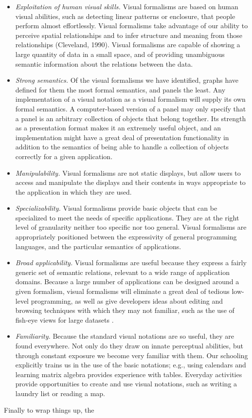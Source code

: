 \documentclass{sig-alternate}
\begin{document}
\begin{itemize}
  \item \emph{Exploitation of human visual skills.} Visual formalisms are based
  on human visual abilities, such as detecting linear patterns or enclosure,
  that people perform almost effortlessly. Visual formalisms take advantage of
  our ability to perceive spatial relationships and to infer structure and
  meaning from those relationships (Cleveland, 1990). Visual formalisms are
  capable of showing a large quantity of data in a small space, and of providing
  unambiguous semantic information about the relations between the data. \item
  \emph{Strong semantics.} Of the visual formalisms we have identified, graphs
  have defined for them the most formal semantics, and panels the least. Any
  implementation of a visual notation as a visual formalism will supply its own
  formal semantics. A computer-based version of a panel may only specify that a
  panel is an arbitrary collection of objects that belong together. Its strength
  as a presentation format makes it an extremely useful object, and an
  implementation might have a great deal of presentation functionality in
  addition to the semantics of being able to handle a collection of objects
  correctly for a given application. \item \emph{Manipulability.}  Visual
  formalisms are not static displays, but allow users to access and manipulate
  the displays and their contents in ways appropriate to the application in
  which they are used. \item \emph{Specializability.}  Visual formalisms provide
  basic objects that can be specialized to meet the needs of specific
  applications. They are at the right level of granularity neither too specific
  nor too general. Visual formalisms are appropriately positioned between the
  expressivity of general programming languages, and the particular semantics of
  applications. \item \emph{Broad applicability.}  Visual formalisms are useful
  because they express a fairly generic set of semantic relations, relevant to a
  wide range of application domains. Because a large number of applications can
  be designed around a given formalism, visual formalisms will eliminate a great
  deal of tedious low-level programming, as well as give developers ideas about
  editing and browsing techniques with which they may not familiar, such as the
  use of fish-eye views for large datasets
  \cite{Furnas:1986:GeneralizedFisheyeViews}\cite{Ciccarelli:1990:BrowsingSchematics}. 
  \item \emph{Familiarity.}
  Because the standard visual notations are so useful, they are found
  everywhere. Not only do they draw on innate perceptual abilities, but through
  constant exposure we become very familiar with them. Our schooling explicitly
  trains us in the use of the basic notations; e.g., using calendars and
  learning matrix algebra provides experience with tables. Everyday activities
  provide opportunities to create and use visual notations, such as writing a
  laundry list or reading a map.\end{itemize} Finally to wrap things up, the
\end{document}
